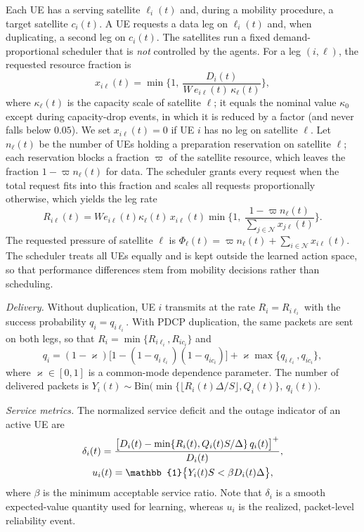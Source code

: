 \documentclass[journal]{IEEEtran}
\newcommand{\Nset}{\mathcal{N}}
\newcommand{\ind}{\mathbb{1}}
\begin{document}
Each UE has a serving satellite $\ell_i(t)$ and, during a mobility procedure,
a target satellite $c_i(t)$. A UE requests a data leg on $\ell_i(t)$ and, when
duplicating, a second leg on $c_i(t)$. The satellites run a fixed
demand-proportional scheduler that is \emph{not} controlled by the agents.
For a leg $(i,\ell)$, the requested resource fraction is
\begin{equation}
x_{i\ell}(t)=\min\Big\{1,\ \frac{D_i(t)}{W\,e_{i\ell}(t)\,\kappa_\ell(t)}\Big\},
\end{equation}
where $\kappa_\ell(t)$ is the capacity scale of satellite $\ell$; it equals
the nominal value $\kappa_0$ except during capacity-drop events, in which it
is reduced by a factor (and never falls below $0.05$). We set $x_{i\ell}(t)=0$
if UE $i$ has no leg on satellite $\ell$. Let $n_\ell(t)$ be the number of
UEs holding a preparation reservation on satellite $\ell$; each reservation
blocks a fraction $\varpi$ of the satellite resource, which leaves the
fraction $1-\varpi n_\ell(t)$ for data. The scheduler grants every request
when the total request fits into this fraction and scales all requests
proportionally otherwise, which yields the leg rate
\begin{equation}
R_{i\ell}(t)=W e_{i\ell}(t)\kappa_\ell(t)\,x_{i\ell}(t)\min\Big\{1,\ \frac{1-\varpi n_\ell(t)}{\sum_{j\in\Nset}x_{j\ell}(t)}\Big\}.
\end{equation}
The requested pressure of satellite $\ell$ is
$\Phi_\ell(t)=\varpi n_\ell(t)+\sum_{i\in\Nset}x_{i\ell}(t)$. The scheduler
treats all UEs equally and is kept outside the learned action space, so that
performance differences stem from mobility decisions rather than scheduling.

\emph{Delivery.} Without duplication, UE $i$ transmits at the rate
$R_i=R_{i\ell_i}$ with the success probability $q_i=q_{i\ell_i}$. With PDCP
duplication, the same packets are sent on both legs, so that
$R_i=\min\{R_{i\ell_i},R_{ic_i}\}$ and
\begin{equation}
q_i=(1-\varkappa)\big[1-(1-q_{i\ell_i})(1-q_{ic_i})\big]+\varkappa\max\{q_{i\ell_i},q_{ic_i}\},
\label{eq:dup}
\end{equation}
where $\varkappa\in[0,1]$ is a common-mode dependence parameter. The number of
delivered packets is
$Y_i(t)\sim\mathrm{Bin}\big(\min\{\lfloor R_i(t)\Delta/S\rfloor,Q_i(t)\},\,q_i(t)\big)$.

\emph{Service metrics.} The normalized service deficit and the outage
indicator of an active UE are
\begin{gather}
\delta_i(t)=\frac{\big[D_i(t)-\min\{R_i(t),Q_i(t)S/\Delta\}\,q_i(t)\big]^+}{D_i(t)},\notag\\
u_i(t)=\ind\big\{Y_i(t)S<\beta D_i(t)\Delta\big\},
\label{eq:service}
\end{gather}
where $\beta$ is the minimum acceptable service ratio. Note that $\delta_i$ is
a smooth expected-value quantity used for learning, whereas $u_i$ is the
realized, packet-level reliability event.
\end{document}

